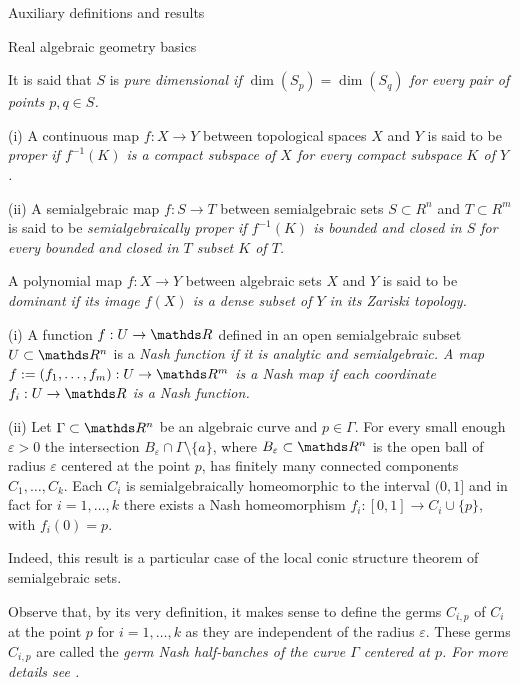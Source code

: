 \documentclass[11pt, a4paper, english, twoside, notitlepage, openright]{report}
\begin{document}
\begin{chapter}{Auxiliary definitions and results}
\begin{section}{Real algebraic geometry basics}
\begin{definition}
	It is said that $S$ is \em pure dimensional \em if $\dim(S_p)=\dim(S_q)$ for every pair of points $p,q\in S$.
\end{definition}

\begin{definitions}\label{properMap}
	  (i) A continuous map $f:X\to Y$ between topological spaces $X$ and $Y$ is said to be \em proper \em if $f^{-1}(K)$ is a compact subspace of $X$ for every compact subspace $K$ of $Y$. 
	  
	  (ii) A semialgebraic map $f:S\to T$ between semialgebraic sets $S\subset R^n$ and $T\subset R^m$ is said to be \em semialgebraically proper \em if $f^{-1}(K)$ is bounded and closed in $S$ for every bounded and closed in $T$ subset $K$ of $T$.  
\end{definitions}

\begin{definition}\label{dominant}
	A polynomial map $f:X\to Y$ between algebraic sets $X$ and $Y$ is said to be \em dominant \em if its image $f(X)$ is a dense subset of $Y$ in its Zariski topology. 
\end{definition}

\begin{definitions}\label{curveGerms}
	(i) A function $f:U\to\R$ defined in an open semialgebraic subset $U\subset\R^n$ is a \em Nash function \em if it is analytic and semialgebraic. A map $f:=(f_1,\dots,f_m):U\to\R^m$ is a \em Nash map \em if each coordinate $f_i:U\to\R$ is a Nash function. 
	
	(ii) Let $\Gamma\subset\R^n$ be an algebraic curve and $p\in\Gamma$. For every small enough $\varepsilon>0$ the intersection $B_{\varepsilon}\cap\Gamma\setminus\{a\}$, %
where $B_{\varepsilon}\subset\R^n$ is the open ball of radius $\varepsilon$ centered at the point $p$, has finitely many connected components $C_1,\dots,C_k$. Each $C_i$ is semialgebraically homeomorphic to the interval $(0,1]$ and in fact for $i=1,\dots,k$ there exists a Nash homeomorphism  $f_i:[0,1]\to C_i\cup\{p\}$, with $f_i(0)=p$.

Indeed, this result is a particular case of the local conic structure theorem of semialgebraic sets. 
	
Observe that, by its very definition, it makes sense to define the germs $C_{i,p}$ of $C_i$ at the point $p$ for $i=1,\dots,k$ as they are independent of the radius $\varepsilon$. These germs  $C_{i,p}$ are called the \em germ Nash half-banches \em of the curve $\Gamma$ centered at $p$. For more details see \cite[IX.5.2]{bcr}. 
\end{definitions}


\end{section}
\end{chapter}
\end{document}
